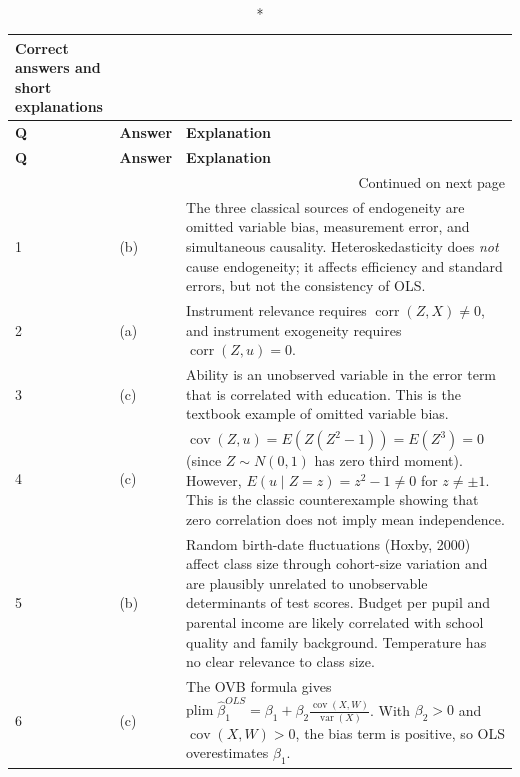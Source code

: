 \documentclass[11pt]{article}
\begin{document}
\renewcommand{\arraystretch}{1.6}
\small
\begin{longtable}{p{}p{}p{}}
\caption*{Correct answers and short explanations} \\
\toprule
\textbf{Q} & \textbf{Answer} & \textbf{Explanation} \\
\midrule
\endfirsthead

\toprule
\textbf{Q} & \textbf{Answer} & \textbf{Explanation} \\
\midrule
\endhead

\midrule
\multicolumn{3}{r}{\small Continued on next page} \\
\endfoot

\bottomrule
\endlastfoot

1 & (b) & The three classical sources of endogeneity are omitted variable bias, measurement error, and simultaneous causality. Heteroskedasticity does \emph{not} cause endogeneity; it affects efficiency and standard errors, but not the consistency of OLS. \\

2 & (a) & Instrument relevance requires $\operatorname{corr}(Z, X) \neq 0$, and instrument exogeneity requires $\operatorname{corr}(Z, u) = 0$. \\

3 & (c) & Ability is an unobserved variable in the error term that is correlated with education. This is the textbook example of omitted variable bias. \\

4 & (c) & $\operatorname{cov}(Z, u) = E(Z(Z^2-1)) = E(Z^3) = 0$ (since $Z \sim N(0,1)$ has zero third moment). However, $E(u \mid Z = z) = z^2 - 1 \neq 0$ for $z \neq \pm 1$. This is the classic counterexample showing that zero correlation does not imply mean independence. \\

5 & (b) & Random birth-date fluctuations (Hoxby, 2000) affect class size through cohort-size variation and are plausibly unrelated to unobservable determinants of test scores. Budget per pupil and parental income are likely correlated with school quality and family background. Temperature has no clear relevance to class size. \\

6 & (c) & The OVB formula gives $\text{plim}\;\widehat{\beta}_1^{OLS} = \beta_1 + \beta_2 \frac{\operatorname{cov}(X,W)}{\operatorname{var}(X)}$. With $\beta_2 > 0$ and $\operatorname{cov}(X,W) > 0$, the bias term is positive, so OLS overestimates $\beta_1$. \\


\end{longtable}
\end{document}
